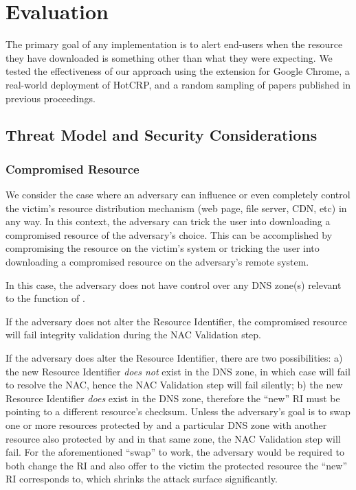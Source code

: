 \section{Evaluation} \label{sec:evaluation}

The primary goal of any \SYSTEM{} implementation is to alert end-users when the
resource they have downloaded is something other than what they were expecting.
We tested the effectiveness of our approach using the \SYSTEM{} extension for
Google Chrome, a real-world deployment of HotCRP, and a random sampling of
papers published in previous \CONFERENCE{} proceedings.

\subsection{Threat Model and Security Considerations}

\subsubsection{Compromised Resource}

We consider the case where an adversary can influence or even completely control
the victim's resource distribution mechanism (web page, file server, CDN, etc)
in any way. In this context, the adversary can trick the user into downloading a
compromised resource of the adversary's choice. This can be accomplished by
compromising the resource on the victim's system or tricking the user into
downloading a compromised resource on the adversary's remote system.

In this case, the adversary does not have control over any DNS zone(s) relevant
to the function of \SYSTEM{}.

If the adversary does not alter the Resource Identifier, the compromised
resource will fail integrity validation during the NAC Validation step.

If the adversary does alter the Resource Identifier, there are two
possibilities: a) the new Resource Identifier \textit{does not} exist in the DNS
zone, in which case \SYSTEM{} will fail to resolve the NAC, hence the NAC
Validation step will fail silently; b) the new Resource Identifier \textit{does}
exist in the DNS zone, therefore the ``new'' RI must be pointing to a different
resource's checksum. Unless the adversary's goal is to swap one or more
resources protected by \SYSTEM{} and a particular DNS zone with another resource
also protected by \SYSTEM{} and in that same zone, the NAC Validation step will
fail. For the aforementioned ``swap'' to work, the adversary would be required
to both change the RI and also offer to the victim the \SYSTEM{} protected
resource the ``new'' RI corresponds to, which shrinks the attack surface
significantly.

